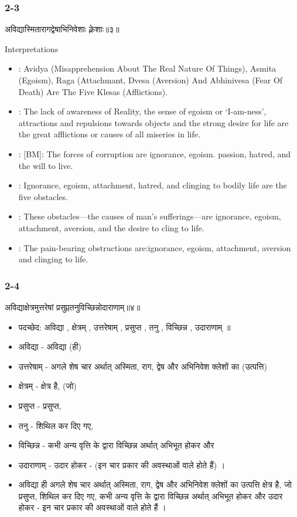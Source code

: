 \begin{frame}[fragile]\frametitle{2-3}
\begin{sanskrit}
अविद्यास्मितारागद्वेषाभिनिवेशाः क्लेशाः॥३॥
\end{sanskrit}

Interpretations
\begin{itemize}
\item [HA]: Avidya (Misapprehension About The Real Nature Of Things), Asmita (Egoism), Raga (Attachmant, Dvesa (Aversion) And Abhinivesa (Fear Of Death) Are The Five Klesas (Afflictions).
\item [IT]: The lack of awareness of Reality, the sense of egoism or ‘I-am-ness’, attractions and repulsions towards objects and the strong desire for life are the great afflictions or causes of all miseries in life.
\item [VH]: [BM]: The forces of corruption are ignorance, egoism. passion, hatred, and the will to live.
\item [SS]: Ignorance, egoism, attachment, hatred, and clinging to bodily life are the five obstacles.
\item [SP]: These obstacles—the causes of man’s sufferings—are ignorance, egoism, attachment, aversion, and the desire to cling to life.
\item [SV]: The pain-bearing obstructions are:ignorance, egoism, attachment, aversion and clinging to life. 
\end{itemize}
	
\end{frame}

\begin{frame}[fragile]\frametitle{2-4}
\begin{sanskrit}
अविद्याक्षेत्रमुत्तरेषां प्रसुप्ततनुविच्छिन्नोदाराणाम्॥४॥
\end{sanskrit}

	\begin{itemize}
	\item पदच्छेद: अविद्या , क्षेत्रम् , उत्तरेषाम् , प्रसुप्त , तनु , विच्छिन्न , उदाराणाम् ॥
	\item अविद्या - अविद्या (ही)
	\item उत्तरेषाम् - अगले शेष चार अर्थात् अस्मिता, राग, द्वेष और अभिनिवेश क्लेशों का (उत्पत्ति)
	\item क्षेत्रम् - क्षेत्र है, (जो)
	\item प्रसुप्त - प्रसुप्त,
	\item तनु - शिथिल कर दिए गए,
	\item विच्छिन्न - कभी अन्य वृत्ति के द्वारा विच्छिन्न अर्थात् अभिभूत होकर और
	\item उदाराणाम् - उदार होकर - (इन चार प्रकार की अवस्थाओं वाले होते हैं) ।	
	\item अविद्या ही अगले शेष चार अर्थात् अस्मिता, राग, द्वेष और अभिनिवेश क्लेशों का उत्पत्ति क्षेत्र है, जो प्रसुप्त, शिथिल कर दिए गए, कभी अन्य वृत्ति के द्वारा विच्छिन्न अर्थात् अभिभूत होकर और उदार होकर - इन चार प्रकार की अवस्थाओं वाले होते हैं ।
	\end{itemize}
	
\end{frame}

